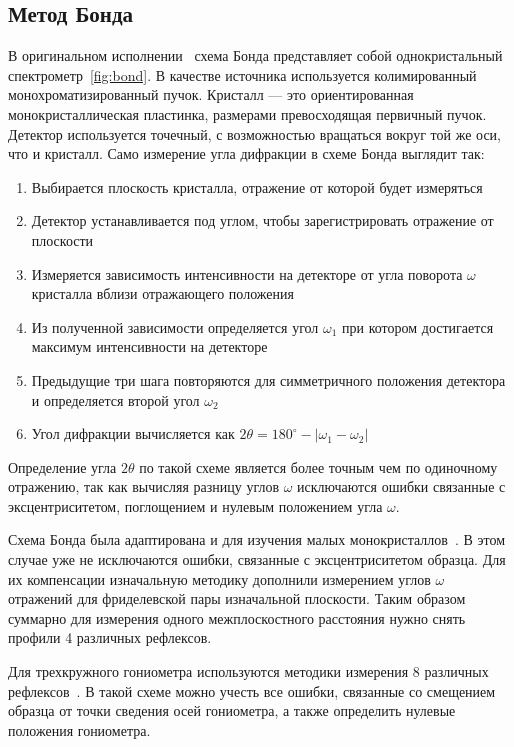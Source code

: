 \documentclass[a4paper,14pt]{extarticle}
\begin{document}
\subsection{Метод Бонда}
В оригинальном исполнении~\cite{Bond:1960} схема Бонда представляет собой однокристальный спектрометр~\ref{fig:bond}.
В качестве источника используется колимированный монохроматизированный пучок.
Кристалл --- это ориентированная монокристаллическая пластинка, размерами превосходящая первичный пучок.
Детектор используется точечный, с возможностью вращаться вокруг той же оси, что и кристалл.
Само измерение угла дифракции в схеме Бонда выглядит так:
\begin{enumerate}
    \item Выбирается плоскость кристалла, отражение от которой будет измеряться
    \item Детектор устанавливается под углом, чтобы зарегистрировать отражение от плоскости
    \item Измеряется зависимость интенсивности на детекторе от угла поворота $\omega$ кристалла вблизи отражающего положения
    \item Из полученной зависимости определяется угол $\omega_1$ при котором достигается максимум интенсивности на детекторе
    \item Предыдущие три шага повторяются для симметричного положения детектора и определяется второй угол $\omega_2$
    \item Угол дифракции вычисляется как $2\theta=180^\circ-|\omega_1-\omega_2|$
\end{enumerate}
Определение угла $2\theta$ по такой схеме является более точным чем по одиночному отражению, так как вычисляя разницу углов $\omega$ исключаются ошибки связанные с эксцентриситетом, поглощением и нулевым положением угла $\omega$.

Схема Бонда была адаптирована и для изучения малых монокристаллов~\cite{Hubbard:1976,Ponomarev:1969}.
В этом случае уже не исключаются ошибки, связанные с эксцентриситетом образца.
Для их компенсации изначальную методику дополнили измерением углов $\omega$ отражений для фриделевской пары изначальной плоскости.
Таким образом суммарно для измерения одного межплоскостного расстояния нужно снять профили 4 различных рефлексов.

Для трехкружного гониометра используются методики измерения 8 различных рефлексов~\cite{King:1979}.
В такой схеме можно учесть все ошибки, связанные со смещением образца от точки сведения осей гониометра, а также определить нулевые положения гониометра.
\end{document}
